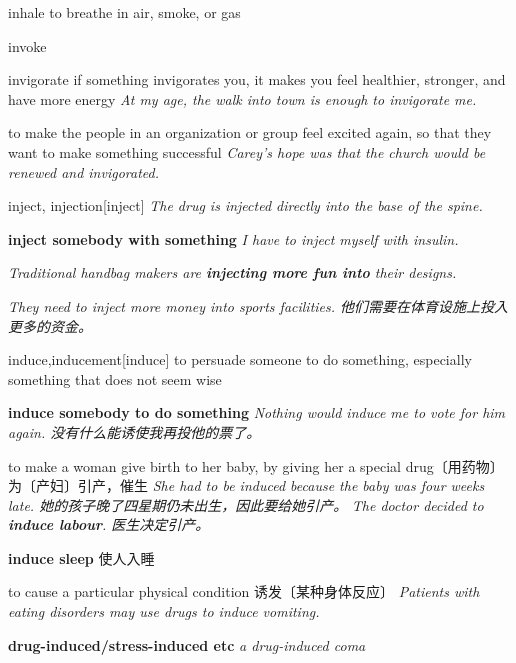 \begin{DefWord}{inhale}
    to breathe in air, smoke, or gas
\end{DefWord}

\begin{DefWord}{invoke}
\end{DefWord}

\begin{DefWord}{invigorate}
    if something invigorates you, it makes you feel healthier, stronger, and have more energy
    \textit{At my age, the walk into town is enough to invigorate me.}

    to make the people in an organization or group feel excited again, so that they want to make something successful
    \textit{Carey's hope was that the church would be renewed and invigorated.}
\end{DefWord}

\begin{DefWord}{inject, injection}[inject]
    \textit{The drug is injected directly into the base of the spine.}

    \textbf{inject somebody with something}
    \textit{I have to inject myself with insulin.}
    
    \textit{Traditional handbag makers are \textbf{injecting more fun into} their designs.}

    \textit{They need to inject more money into sports facilities. 他们需要在体育设施上投入更多的资金。 }
\end{DefWord}

\begin{DefWord}{induce,inducement}[induce]
    to persuade someone to do something, especially something that does not seem wise

    \textbf{induce somebody to do something}
    \textit{Nothing would induce me to vote for him again. 没有什么能诱使我再投他的票了。 }

    to make a woman give birth to her baby, by giving her a special drug〔用药物〕为〔产妇〕引产，催生
    \textit{She had to be induced because the baby was four weeks late. 她的孩子晚了四星期仍未出生，因此要给她引产。 }
    \textit{The doctor decided to \textbf{induce labour}. 医生决定引产。 }

    \textbf{induce sleep} 使人入睡

    to cause a particular physical condition 诱发〔某种身体反应〕
    \textit{Patients with eating disorders may use drugs to induce vomiting.}

    \textbf{drug-induced/stress-induced etc}
    \textit{a drug-induced coma}
\end{DefWord}